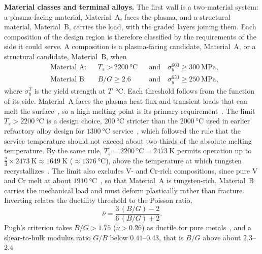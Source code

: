 \textbf{Material classes and terminal alloys.} The first wall is a two-material
system: a plasma-facing material, Material~A, faces the plasma, and a structural
material, Material~B, carries the load, with the graded layers joining them. Each composition of the design region is therefore classified by the
requirements of the side it could serve. A composition is a plasma-facing
candidate, Material~A, or a structural candidate, Material~B, when
\begin{equation}
\begin{aligned}
&\text{Material A:} && T_s > \SI{2200}{\celsius}
  &&\text{and}\quad \sigma_y^{600} \ge \SI{300}{\mega\pascal},\\
&\text{Material B:} && B/G \ge 2.6
  &&\text{and}\quad \sigma_y^{650} \ge \SI{250}{\mega\pascal},
\end{aligned}
\label{eq:classes}
\end{equation}
where \(\sigma_y^{T}\) is the yield strength at \(T\)~\si{\celsius}. Each threshold
follows from the function of its side. Material~A faces the plasma heat flux and
transient loads that can melt the surface~\cite{linke2019pfc,Pitts2019}, so a high
melting point is its primary requirement~\cite{PFMscreeningPRX2024}. The limit
\(T_s > \SI{2200}{\celsius}\) is a design choice, \(\SI{200}{\celsius}\) stricter
than the \(\SI{2000}{\celsius}\) used in earlier refractory alloy design for
\(\SI{1300}{\celsius}\) service~\cite{vela2023highthroughput,khatamsaz2023bayesian},
which followed the rule that the service temperature should not exceed about
two-thirds of the absolute melting temperature. By the same rule,
\(T_s = \SI{2200}{\celsius} = \SI{2473}{\kelvin}\) permits operation up to
\(\tfrac{2}{3}\times\SI{2473}{\kelvin} \approx \SI{1649}{\kelvin}\)
(\(\approx\SI{1376}{\celsius}\)), above the temperature at which tungsten
recrystallizes~\cite{stork2014developing}. The limit also excludes V- and Cr-rich
compositions, since pure V and Cr melt at about \(\SI{1910}{\celsius}\)~\cite{haynes2016crc},
so that Material~A is tungsten-rich. Material~B carries the mechanical load and must
deform plastically rather than fracture. Inverting  relates the
ductility threshold to the Poisson ratio,
\begin{equation}
\bar{\nu}=\frac{3\,(B/G)-2}{6\,(B/G)+2}.
\label{eq:nu}
\end{equation}
Pugh's criterion takes \(B/G > 1.75\) (\(\bar{\nu} > 0.26\)) as ductile for pure
metals~\cite{pugh1954}, and a shear-to-bulk modulus ratio \(G/B\) below
\(0.41\)--\(0.43\), that is \(B/G\) above about \(2.3\)--\(2.4\)
